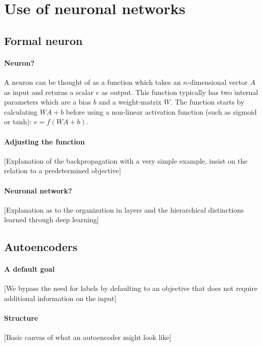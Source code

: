 \documentclass[a4paper,french,11pt]{article}
\begin{document}
\section{Use of neuronal networks}

\subsection{Formal neuron}

\paragraph{Neuron?}
A neuron can be thought of as a function which takes an $n$-dimensional vector $A$ as input and returns a scalar $e$ as output. This function typically has two internal parameters which are a bias $b$ and a weight-matrix $W$. The function starts by calculating $WA+b$ before using a non-linear activation function (such as sigmoid or tanh): $e=f(WA+b)$.

\paragraph{Adjusting the function}

[Explanation of the backpropagation with a very simple example, insist on the relation to a predetermined objective]

\paragraph{Neuronal network?}

[Explanation as to the organization in layers and the hierarchical distinctions learned through deep learning]

\subsection{Autoencoders}

\paragraph{A default goal}
[We bypass the need for labels by defaulting to an objective that does not require additional information on the input]

\paragraph{Structure}
[Basic canvas of what an autoencoder might look like]
\end{document}
